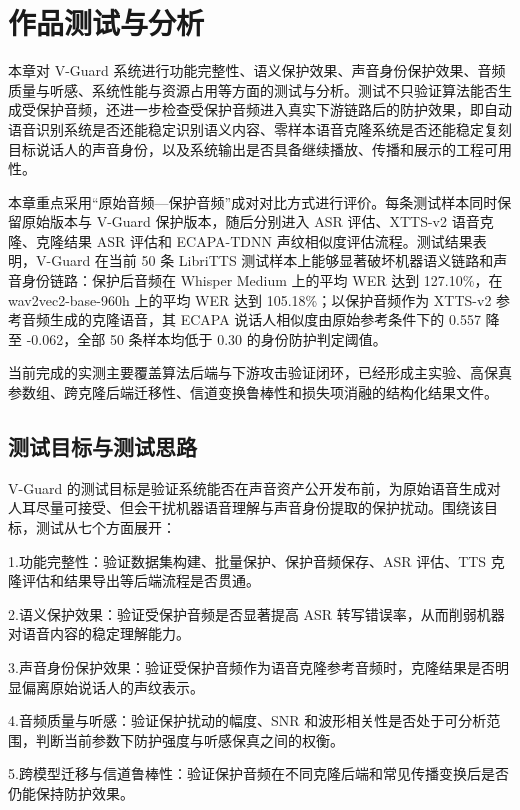 \chapter{作品测试与分析}\label{ux7b2cux56dbux7ae0-ux4f5cux54c1ux6d4bux8bd5ux4e0eux5206ux6790}

本章对 V-Guard
系统进行功能完整性、语义保护效果、声音身份保护效果、音频质量与听感、系统性能与资源占用等方面的测试与分析。测试不只验证算法能否生成受保护音频，还进一步检查受保护音频进入真实下游链路后的防护效果，即自动语音识别系统是否还能稳定识别语义内容、零样本语音克隆系统是否还能稳定复刻目标说话人的声音身份，以及系统输出是否具备继续播放、传播和展示的工程可用性。

本章重点采用``原始音频---保护音频''成对对比方式进行评价。每条测试样本同时保留原始版本与
V-Guard 保护版本，随后分别进入 ASR 评估、XTTS-v2 语音克隆、克隆结果 ASR
评估和 ECAPA-TDNN 声纹相似度评估流程。测试结果表明，V-Guard 在当前 50 条
LibriTTS 测试样本上能够显著破坏机器语义链路和声音身份链路：保护后音频在
Whisper Medium 上的平均 WER 达到 127.10\%，在 wav2vec2-base-960h
上的平均 WER 达到 105.18\%；以保护音频作为 XTTS-v2
参考音频生成的克隆语音，其 ECAPA 说话人相似度由原始参考条件下的 0.557
降至 -0.062，全部 50 条样本均低于 0.30 的身份防护判定阈值。

当前完成的实测主要覆盖算法后端与下游攻击验证闭环，已经形成主实验、高保真参数组、跨克隆后端迁移性、信道变换鲁棒性和损失项消融的结构化结果文件。

\section{测试目标与测试思路}\label{ux6d4bux8bd5ux76eeux6807ux4e0eux6d4bux8bd5ux601dux8def}

V-Guard
的测试目标是验证系统能否在声音资产公开发布前，为原始语音生成对人耳尽量可接受、但会干扰机器语音理解与声音身份提取的保护扰动。围绕该目标，测试从七个方面展开：

1.功能完整性：验证数据集构建、批量保护、保护音频保存、ASR 评估、TTS
克隆评估和结果导出等后端流程是否贯通。

2.语义保护效果：验证受保护音频是否显著提高 ASR
转写错误率，从而削弱机器对语音内容的稳定理解能力。

3.声音身份保护效果：验证受保护音频作为语音克隆参考音频时，克隆结果是否明显偏离原始说话人的声纹表示。

4.音频质量与听感：验证保护扰动的幅度、SNR
和波形相关性是否处于可分析范围，判断当前参数下防护强度与听感保真之间的权衡。

5.跨模型迁移与信道鲁棒性：验证保护音频在不同克隆后端和常见传播变换后是否仍能保持防护效果。

